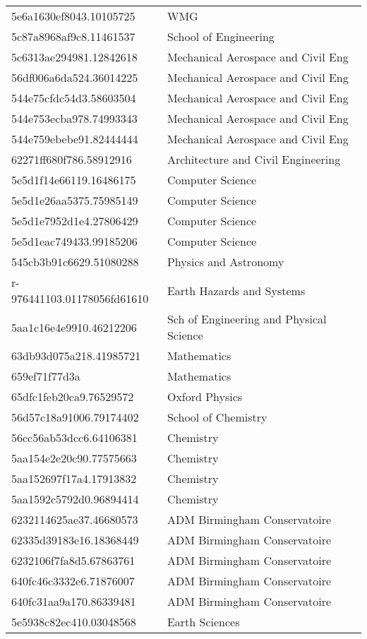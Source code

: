 \begin{tabular}{ll}
5e6a1630ef8043.10105725 & WMG \\
5c87a8968af9c8.11461537 & School of Engineering \\
5c6313ae294981.12842618 & Mechanical Aerospace and Civil Eng \\
56df006a6da524.36014225 & Mechanical Aerospace and Civil Eng \\
544e75cfdc54d3.58603504 & Mechanical Aerospace and Civil Eng \\
544e753ecba978.74993343 & Mechanical Aerospace and Civil Eng \\
544e759ebebe91.82444444 & Mechanical Aerospace and Civil Eng \\
62271ff680f786.58912916 & Architecture and Civil Engineering \\
5e5d1f14e66119.16486175 & Computer Science \\
5e5d1e26aa5375.75985149 & Computer Science \\
5e5d1e7952d1e4.27806429 & Computer Science \\
5e5d1eac749433.99185206 & Computer Science \\
545cb3b91c6629.51080288 & Physics and Astronomy \\
r-976441103.01178056fd61610 & Earth Hazards and Systems \\
5aa1c16e4e9910.46212206 & Sch of Engineering and Physical Science \\
63db93d075a218.41985721 & Mathematics \\
659ef71f77d3a & Mathematics \\
65dfc1feb20ca9.76529572 & Oxford Physics \\
56d57c18a91006.79174402 & School of Chemistry \\
56cc56ab53dcc6.64106381 & Chemistry \\
5aa154e2e20c90.77575663 & Chemistry \\
5aa152697f17a4.17913832 & Chemistry \\
5aa1592c5792d0.96894414 & Chemistry \\
6232114625ae37.46680573 & ADM Birmingham Conservatoire \\
62335d39183e16.18368449 & ADM Birmingham Conservatoire \\
6232106f7fa8d5.67863761 & ADM Birmingham Conservatoire \\
640fc46c3332e6.71876007 & ADM Birmingham Conservatoire \\
640fc31aa9a170.86339481 & ADM Birmingham Conservatoire \\
5e5938c82ec410.03048568 & Earth Sciences \\

\end{tabular}
